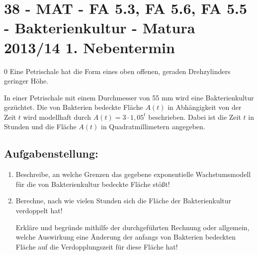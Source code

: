 \section{38 - MAT - FA 5.3, FA 5.6, FA 5.5 - Bakterienkultur - Matura 2013/14 1. Nebentermin}

\begin{langesbeispiel} \item[0] %
				Eine Petrischale hat die Form eines oben offenen, geraden Drehzylinders geringer Höhe.
				
				In einer Petrischale mit einem Durchmesser von 55 mm wird eine Bakterienkultur gezüchtet. Die von Bakterien bedeckte Fläche $A(t)$ in Abhängigkeit von der Zeit $t$ wird modellhaft durch $A(t)=3\cdot 1,05^t$ beschrieben. Dabei ist die Zeit $t$ in Stunden und die Fläche $A(t)$ in Quadratmillimetern angegeben.
				
\subsection{Aufgabenstellung:}
\begin{enumerate}
	\item {} 
					
					Beschreibe, an welche Grenzen das gegebene exponentielle Wachstumsmodell für die von Bakterienkultur bedeckte Fläche stößt!
					
\item Berechne, nach wie vielen Stunden sich die Fläche der Bakterienkultur verdoppelt hat!

Erkläre und begründe mithilfe der durchgeführten Rechnung oder allgemein, welche Auswirkung eine Änderung der anfangs von Bakterien bedeckten Fläche auf die Verdopplungszeit für diese Fläche hat!
						\end{enumerate}\leer
				
\end{langesbeispiel}
